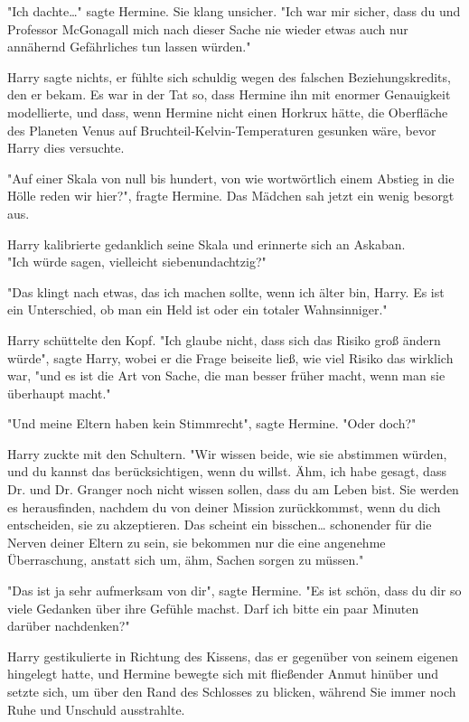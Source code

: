{"Ich dachte…" sagte Hermine. Sie klang unsicher. "Ich war mir sicher, dass du und Professor McGonagall mich nach dieser Sache nie wieder etwas auch nur annähernd Gefährliches tun lassen würden."

Harry sagte nichts, er fühlte sich schuldig wegen des falschen Beziehungskredits, den er bekam. Es war in der Tat so, dass Hermine ihn mit enormer Genauigkeit modellierte, und dass, wenn Hermine nicht einen Horkrux hätte, die Oberfläche des Planeten Venus auf Bruchteil-Kelvin-Temperaturen gesunken wäre, bevor Harry dies versuchte.

"Auf einer Skala von null bis hundert, von wie wortwörtlich einem Abstieg in die Hölle reden wir hier?", fragte Hermine. Das Mädchen sah jetzt ein wenig besorgt aus.

Harry kalibrierte gedanklich seine Skala und erinnerte sich an Askaban.\\ "Ich würde sagen, vielleicht siebenundachtzig?"

"Das klingt nach etwas, das ich machen sollte, wenn ich älter bin, Harry. Es ist ein Unterschied, ob man ein Held ist oder ein totaler Wahnsinniger."

Harry schüttelte den Kopf. "Ich glaube nicht, dass sich das Risiko groß ändern würde", sagte Harry, wobei er die Frage beiseite ließ, wie viel Risiko das wirklich war, "und es ist die Art von Sache, die man besser früher macht, wenn man sie überhaupt macht."

"Und meine Eltern haben kein Stimmrecht", sagte Hermine. "Oder doch?"

Harry zuckte mit den Schultern. "Wir wissen beide, wie sie abstimmen würden, und du kannst das berücksichtigen, wenn du willst. Ähm, ich habe gesagt, dass Dr. und Dr. Granger noch nicht wissen sollen, dass du am Leben bist. Sie werden es herausfinden, nachdem du von deiner Mission zurückkommst, wenn du dich entscheiden, sie zu akzeptieren. Das scheint ein bisschen… schonender für die Nerven deiner Eltern zu sein, sie bekommen nur die eine angenehme Überraschung, anstatt sich um, ähm, Sachen sorgen zu müssen."

"Das ist ja sehr aufmerksam von dir", sagte Hermine. "Es ist schön, dass du dir so viele Gedanken über ihre Gefühle machst. Darf ich bitte ein paar Minuten darüber nachdenken?"

Harry gestikulierte in Richtung des Kissens, das er gegenüber von seinem eigenen hingelegt hatte, und Hermine bewegte sich mit fließender Anmut hinüber und setzte sich, um über den Rand des Schlosses zu blicken, während Sie immer noch Ruhe und Unschuld ausstrahlte.

}
